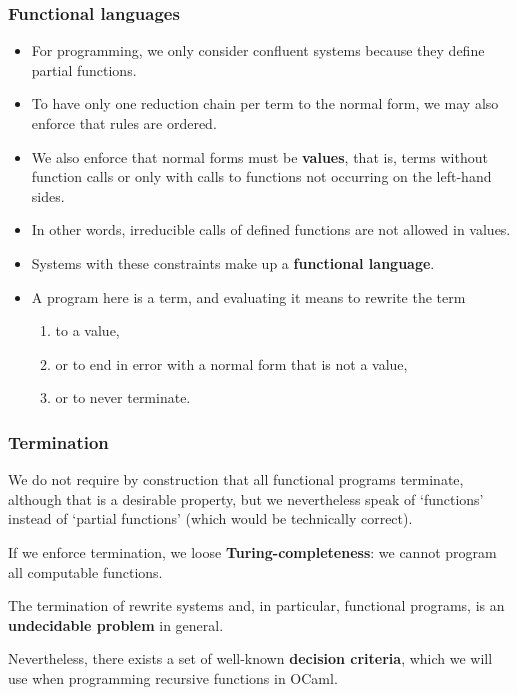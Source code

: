 \documentclass[compress,dvipdfmx]{beamer}
\newcommand{\OCaml}{\textsf{OCaml}\xspace}
\begin{document}
\begin{frame}
  \frametitle{Functional languages}

  \begin{itemize}

    \item For programming, we only consider confluent systems because
      they define partial functions.

    \item To have only one reduction chain per term to the normal
      form, we may also enforce that rules are ordered.

    \item We also enforce that normal forms must be \textbf{values},
      that is, terms without function calls or only with calls to
      functions not occurring on the left\hyp{}hand sides.

    \item In other words, irreducible calls of defined functions are
      not allowed in values.

    \item Systems with these constraints make up a \textbf{functional
      language}.

    \item A program here is a term, and evaluating it means to rewrite
      the term
      \begin{enumerate}
        \item to a value,
        \item or to end in error with a normal form that is not a value,
        \item or to never terminate.
      \end{enumerate}

  \end{itemize}

\end{frame}


\begin{frame}
  \frametitle{Termination}

  We do not require by construction that all functional programs
  terminate, although that is a desirable property, but we
  nevertheless speak of `functions' instead of `partial functions'
  (which would be technically correct).

  \bigskip

  If we enforce termination, we loose
  \textbf{Turing\hyp{}completeness}: we cannot program all computable
  functions.

  \bigskip

  The termination of rewrite systems and, in particular, functional
  programs, is an \textbf{undecidable problem} in general.

  \bigskip

  Nevertheless, there exists a set of well\hyp{}known \textbf{decision
    criteria}, which we will use when programming recursive functions
  in \OCaml.

\end{frame}
\end{document}
